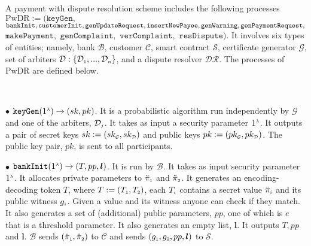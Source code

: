 \begin{definition} A payment with dispute resolution  scheme  includes the following   processes $\text{PwDR}:=(\mathtt{keyGen}, $ $\mathtt{bankInit}, \mathtt{customerInit},  \mathtt{genUpdateRequest}, \mathtt{insertNewPayee}, \mathtt{genWarning}, \mathtt{genPaymentRequest}, \\$ $\mathtt{makePayment}, $ $ \mathtt{genComplaint}, $ $\mathtt{verComplaint},$ $ \mathtt{resDispute})$. It involves  six   types of entities; namely,  bank $\mathcal{B}$, customer $\mathcal{C}$,  smart contract $\mathcal{S}$,  certificate generator $\mathcal{G}$,   set of arbiters $\mathcal{D}:\{\mathcal{D}_{\scriptscriptstyle 1},..., \mathcal{D}_{\scriptscriptstyle n}\}$, and a dispute resolver $\mathcal{DR}$. The processes of PwDR are defined below.  

%
\

\item [$\bullet$]  $\mathtt{keyGen}(1^{\scriptscriptstyle \lambda})\rightarrow (sk,pk)$. It is a probabilistic  algorithm run independently by  $\mathcal{G}$ and one of the arbiters, $\mathcal{D}_{\scriptscriptstyle j}$. It takes as input a security parameter $1^{\scriptscriptstyle \lambda}$. It outputs a pair of secret keys $sk:=(sk_{\scriptscriptstyle\mathcal {G}},sk_{\scriptscriptstyle\mathcal {D}})$ and public keys $pk:=(pk_{\scriptscriptstyle\mathcal {G}},pk_{\scriptscriptstyle\mathcal {D}})$. The public key pair, $pk$, is sent to all participants. 


\vspace{2mm}
\item[$\bullet$] $\mathtt{bankInit}(1^{\scriptscriptstyle \lambda})\rightarrow (T, pp, \bm{l})$. It is  run by  $\mathcal{B}$. It takes as input  security parameter $1^{\scriptscriptstyle \lambda}$.  It allocates private parameters to  $\ddot\pi_{\scriptscriptstyle 1}$ and $\ddot\pi_{\scriptscriptstyle 2}$. It generates an encoding-decoding token $T$, where  $T:=(T_{\scriptscriptstyle 1},T_{\scriptscriptstyle 2})$,  each $T_{\scriptscriptstyle i}$  contains  a secret value $\ddot\pi_{\scriptscriptstyle i}$ and its public witness $g_{\scriptscriptstyle i}$.    Given a  value and its witness anyone can check if they match. It also generates a set of (additional) public parameters,  $pp$, one of which is $e$ that is a threshold parameter.  It also generates an  empty list, $\bm{l}$. It outputs $T, pp$ and $\bm l$.  $\mathcal{B}$ sends $(\ddot\pi_{\scriptscriptstyle 1}, \ddot\pi_{\scriptscriptstyle 2})$ to $\mathcal{C}$ and sends $(g_{\scriptscriptstyle 1}, g_{\scriptscriptstyle 2},  pp, \bm {l})$ to $\mathcal{S}$.


\end{definition}
